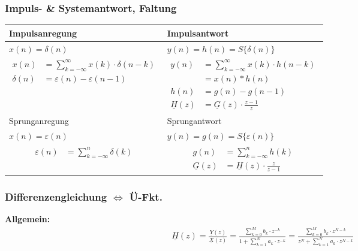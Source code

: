 \begin{multicols*}{2}
\subsubsection{Impuls- \& Systemantwort, Faltung}
\small
\begin{centering}
\begin{tabularx}{\columnwidth}{|X|X|}
	\hline
	Impulsanregung & Impulsantwort\\
	\hline
	$x(n)=\delta(n)$ & $y(n)= h(n) = S\{ \delta(n) \}$ \\
	\hline
	{
	\begin{align*}
		x(n) &= \sum_{k=-\infty}^{\infty}x(k) \cdot \delta(n-k)\\
		\delta(n) &= \varepsilon(n)-\varepsilon(n-1)
	\end{align*}
	}	 &
	{
	\begin{align*}	
		y(n) &= \sum_{k=-\infty}^{\infty}x(k) \cdot h(n-k)\\
		&= x(n) * h(n)\\
		h(n) &= g(n)-g(n-1)\\
		\underline{H}(z)&=\underline{G}(z)\cdot \frac{z-1}{z}
	\end{align*}
	}	\\
	\hline\hline
	Sprunganregung & Sprungantwort \\
	\hline
	$x(n)=\varepsilon(n)$ & $y(n)= g(n) = S\{ \varepsilon(n) \}$ \\
	\hline
	{
		\begin{align*}	
			\varepsilon(n) &= \sum_{k=-\infty}^{n} \delta(k)
		\end{align*}
	} &
	{
		\begin{align*}	
			g(n) &= \sum_{k=-\infty}^{n} h(k)\\
					\underline{G}(z)&=\underline{H}(z)\cdot \frac{z}{z-1}
		\end{align*}
	}	\\
	\hline
	\end{tabularx}
\end{centering}
\normalsize
\subsubsection{Differenzengleichung $\Leftrightarrow$ Ü-Fkt.}
\textbf{Allgemein:}
\begin{gather*}
	\underline{H}(z)=\frac{\underline{Y}(z)}{\underline{X}(z)}=\frac{\sum_{k=0}^{M} b_{k} \cdot z^{-k}}{1+\sum_{k=1}^{N} a_{k} \cdot z^{-k}}=\frac{\sum_{k=0}^{M} b_{k} \cdot z^{N-k}}{z^{N}+\sum_{k=1}^{N} a_{k} \cdot z^{N-k}}
\end{gather*}


\end{multicols*}
